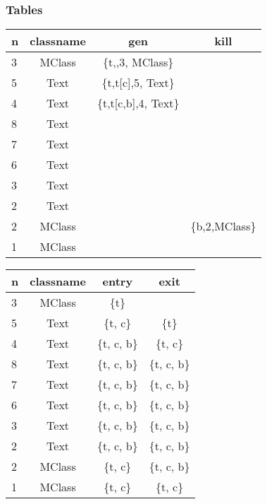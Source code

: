 \documentclass[letterpaper,twocolumn,10pt]{article}
\begin{document}
\subsubsection{Tables}
\begin{center}
\begin{tabular}{|l|*{3}{c|}}
  \hline
  n & classname & gen & kill  \\
  \hline 
  3 & MClass & \{t,,3, MClass\} & \\ 
  5 & Text & \{t,t[c],5, Text\} & \\
  4 & Text & \{t,t[c,b],4, Text\} & \\
  8 & Text &  & \\
  7 & Text &  & \\
  6 & Text &  & \\
  3 & Text &  & \\
  2 & Text &  & \\
  2 & MClass &  & \{b,2,MClass\}\\
  1 & MClass &  & \\
  \hline
\end{tabular}
\end{center}
\begin{center}
\begin{supertabular}{|l|*{3}{c|}}
  \hline
  n & classname & entry & exit  \\
   & MClass & \{t\} &  \\ 
  5 & Text & \{t, c\} & \{t\} \\
  4 & Text & \{t, c, b\} & \{t, c\} \\
  8 & Text & \{t, c, b\} & \{t, c, b\}    \\
  7 & Text & \{t, c, b\} & \{t, c, b\}    \\
  6 & Text & \{t, c, b\} & \{t, c, b\}    \\
  3 & Text & \{t, c, b\} & \{t, c, b\}    \\
  2 & Text & \{t, c, b\} & \{t, c, b\}    \\
  2 & MClass & \{t, c\} & \{t, c, b\}    \\
  1 & MClass & \{t, c\} & \{t, c\}    \\
  \hline
\end{supertabular}
\end{center}
\end{document}
